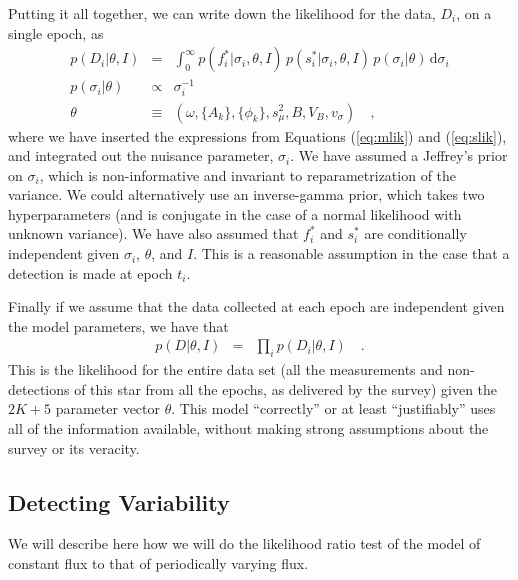 \documentclass[12pt,preprint]{aastex}
\newcommand{\dd}{\mathrm{d}}
\newcommand{\fobs}{f_i^*}
\newcommand{\sobs}{s_i^*}
\begin{document}
Putting it all together, we can write down the likelihood for the data, $D_i$, on a single epoch, as
\begin{eqnarray}\displaystyle
p(D_i|\theta,I) &=& \int_0^{\infty} p(\fobs |\sigma_i,\theta,I)\, p(\sobs |\sigma_i,\theta,I)\, p(\sigma_i | \theta)\,\dd \sigma_i
\\
p(\sigma_i|\theta) &\propto& \sigma_i^{-1}
\\
\theta &\equiv& (\omega, \{A_k\}, \{\phi_k\}, s_\mu^2, B, V_B ,v_\sigma) \quad ,
\end{eqnarray}
where we have inserted the expressions from Equations (\ref{eq:mlik}) and (\ref{eq:slik}), and integrated out the nuisance parameter, $\sigma_i$.  We have assumed a Jeffrey's prior on $\sigma_i$, which is non-informative and invariant to reparametrization of the variance.  We could alternatively use an inverse-gamma prior, which takes two hyperparameters (and is conjugate in the case of a normal likelihood with unknown variance).  We have also assumed that $\fobs$ and $\sobs$ are conditionally independent given $\sigma_i$, $\theta$, and $I$.  This is a reasonable assumption in the case that a detection is made at epoch $t_i$.


Finally if we assume that the data collected at each epoch are independent given the model parameters, we have that
\begin{eqnarray}\displaystyle
p(D|\theta,I) &=& \prod_i p(D_i|\theta,I)
\quad.
\end{eqnarray}
This is the likelihood for the entire
data set (all the measurements and non-detections of this star from
all the epochs, as delivered by the survey) given the $2K + 5$ parameter vector $\theta$.  This model
``correctly'' or at least ``justifiably'' uses all of the information
available, without making strong assumptions about the survey or its
veracity.


\subsection{Detecting Variability}

We will describe here how we will do the likelihood ratio test of the model of constant flux to that of periodically varying flux.



\end{document}
